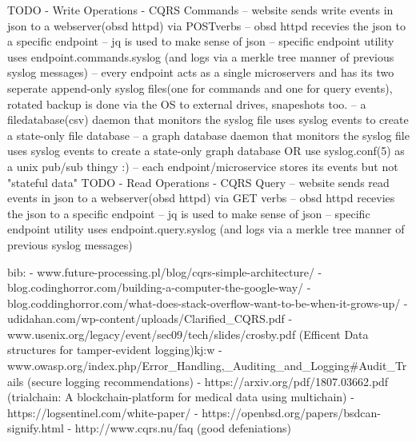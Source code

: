 TODO
- Write Operations - CQRS Commands
-- website sends write events in json to a webserver(obsd httpd) via POST\PUT verbs
-- obsd httpd recevies the json to a specific endpoint 
-- jq is used to make sense of json
-- specific endpoint utility uses endpoint.commands.syslog (and logs via a merkle tree manner of previous syslog messages)
-- every endpoint acts as a single microservers and has its two seperate append-only syslog files(one for commands and one for query events), rotated backup is done via the OS to external drives, snapeshots too. 
-- a filedatabase(csv) daemon that monitors the syslog file uses syslog events to create a state-only file database 
-- a graph database daemon that monitors the syslog file uses syslog events to create a state-only graph database
OR use 	syslog.conf(5) as a unix pub/sub thingy :)
-- each endpoint/microservice stores its events but not "stateful data" 
TODO
- Read Operations - CQRS Query
-- website sends read events in json to a webserver(obsd httpd) via GET verbs
-- obsd httpd recevies the json to a specific endpoint 
-- jq is used to make sense of json
-- specific endpoint utility uses endpoint.query.syslog (and logs via a merkle tree manner of previous syslog messages)

bib:
- www.future-processing.pl/blog/cqrs-simple-architecture/
- blog.codinghorror.com/building-a-computer-the-google-way/
- blog.coddinghorror.com/what-does-stack-overflow-want-to-be-when-it-grows-up/
- udidahan.com/wp-content/uploads/Clarified_CQRS.pdf
- www.usenix.org/legacy/event/sec09/tech/slides/crosby.pdf (Efficent Data structures for tamper-evident logging)kj:w
- www.owasp.org/index.php/Error_Handling,_Auditing_and_Logging#Audit_Trails (secure logging recommendations) 
- https://arxiv.org/pdf/1807.03662.pdf (trialchain: A blockchain-platform for medical data using multichain)
- https://logsentinel.com/white-paper/
- https://openbsd.org/papers/bsdcan-signify.html
- http://www.cqrs.nu/faq (good defeniations)
